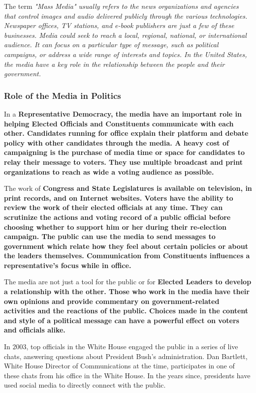 The term \it{"Mass Media"} usually refers to the news organizations and agencies that control images and audio delivered publicly through the various technologies. Newspaper offices, TV stations, and e-book publishers are just a few of these businesses. Media could seek to reach a local, regional, national, or international audience. It can focus on a particular type of message, such as political campaigns, or address a wide range of interests and topics. In the United States, the media have a key role in the relationship between the people and their government.

\subsubsection*{Role of the Media in Politics}

In a \bf{Representative Democracy}, the media have an important role in helping \bf{Elected Officials} and \bf{Constituents} communicate with each other. \bf{Candidates} running for office explain their platform and debate policy with other candidates through the media. A heavy cost of campaigning is the purchase of media time or space for candidates to relay their message to voters. They use multiple broadcast and print organizations to reach as wide a voting audience as possible.

The work of \bf{Congress} and \bf{State Legislatures} is available on television, in print records, and on Internet websites. Voters have the ability to review the work of their elected officials at any time. They can scrutinize the actions and voting record of a public official before choosing whether to support him or her during their re-election campaign. The public can use the media to send messages to government which relate how they feel about certain policies or about the leaders themselves. Communication from \bf{Constituents} influences a representative's focus while in office.

The media are not just a tool for the public or for \bf{Elected Leaders} to develop a relationship with the other. Those who work in the media have their own opinions and provide commentary on government-related activities and the reactions of the public. Choices made in the content and style of a political message can have a powerful effect on voters and officials alike.

In $2003$, top officials in the White House engaged the public in a series of live chats, answering questions about President Bush's administration. Dan Bartlett, White House Director of Communications at the time, participates in one of these chats from his office in the White House. In the years since, presidents have used social media to directly connect with the public.

